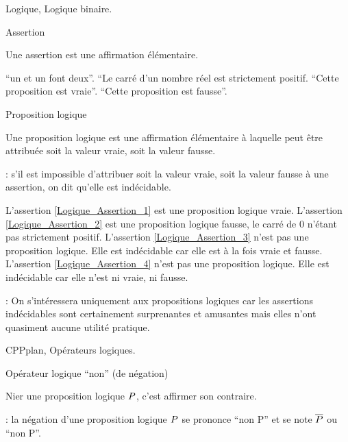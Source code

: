 
\fi

%

\Chapter Logique, Logique binaire. 

\Concept Assertion


\Definition 
Une assertion est une affirmation \'el\'ementaire. 

\Exemple
{}\qquad{} ``un et un font deux''.
\qquad{} ``Le carr\'e d'un nombre r\'eel est strictement positif.
\qquad{} ``Cette proposition est vraie''. 
\qquad{} ``Cette proposition est fausse''. 

\Concept Proposition logique

\Definition
Une proposition logique est une affirmation \'el\'ementaire \`a laquelle peut \^etre attribu\'ee soit la valeur vraie, soit la valeur fausse. 

\Remarque : s'il est impossible d'attribuer soit la valeur vraie, soit la valeur fausse \`a une assertion, on dit qu'elle est ind\'ecidable. 
\bigskip

\Exemple
{} L'assertion \eqref{Logique_Assertion_1} est une proposition logique vraie. 
 L'assertion \eqref{Logique_Assertion_2} est une proposition logique fausse, le carr\'e de $0$ n'\'etant pas strictement positif.
 L'assertion \eqref{Logique_Assertion_3} n'est pas une proposition logique. Elle est ind\'ecidable car  elle  est \`a la fois vraie et fausse. 
 L'assertion \eqref{Logique_Assertion_4} n'est pas une proposition logique. Elle est ind\'ecidable car  elle  n'est ni vraie, ni fausse. 

\Remarque : On s'int\'eressera uniquement aux propositions logiques car les assertions ind\'ecidables 
sont certainement surprenantes et amusantes mais elles n'ont quasiment aucune utilit\'e pratique. 

\Section CPPplan, Op\'erateurs logiques. 

\Concept [Title=Op\'erateur logique ``non''] Op\'erateur logique ``non'' (de n\'egation)

\Definition
Nier une proposition logique $\sc P$, c'est affirmer son contraire. 

\Remarque : la n\'egation d'une proposition logique $\sc P$ se prononce ``non \sc P'' et se note $\overline{\sc P}$ ou ``non \sc P''. 
\bigskip

